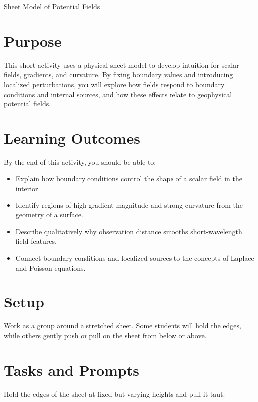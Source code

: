 \begin{activity}{Sheet Model of Potential Fields}

\section*{Purpose}
This short activity uses a physical sheet model to develop intuition for scalar fields, gradients, and curvature. By fixing boundary values and introducing localized perturbations, you will explore how fields respond to boundary conditions and internal sources, and how these effects relate to geophysical potential fields.

\section*{Learning Outcomes}

By the end of this activity, you should be able to:
\begin{itemize}
  \item Explain how boundary conditions control the shape of a scalar field in the interior.
  \item Identify regions of high gradient magnitude and strong curvature from the geometry of a surface.
  \item Describe qualitatively why observation distance smooths short-wavelength field features.
  \item Connect boundary conditions and localized sources to the concepts of Laplace and Poisson equations.
\end{itemize}

\section*{Setup}
Work as a group around a stretched sheet. Some students will hold the edges, while others gently push or pull on the sheet from below or above.

\section*{Tasks and Prompts}

\begin{questions}
    Hold the edges of the sheet at fixed but varying heights and pull it taut.
\end{questions}
\end{activity}
